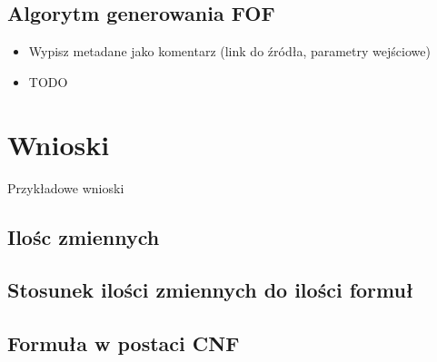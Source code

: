 \documentclass[a4paper,12pt]{article}
\begin{document}
\subsection{Algorytm generowania FOF}
\begin{itemize}
  \item Wypisz metadane jako komentarz (link do źródła, parametry wejściowe)
  \item TODO
\end{itemize}

\section{Wnioski}

Przykładowe wnioski

\subsection{Ilośc zmiennych}

\subsection{Stosunek ilości zmiennych do ilości formuł}

\subsection{Formuła w postaci CNF}

\printglossary[type=\acronymtype]
\printglossary
\end{document}
